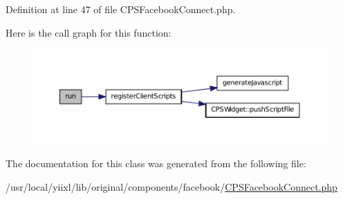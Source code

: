 Definition at line 47 of file CPSFacebookConnect.php.








Here is the call graph for this function:\nopagebreak
\begin{figure}[H]
\begin{center}
\leavevmode
\includegraphics[width=400pt]{classCPSFacebookConnect_afb0fafe7e02a3ae1993c01c19fad2bae_cgraph}
\end{center}
\end{figure}




The documentation for this class was generated from the following file:\begin{DoxyCompactItemize}
\item 
/usr/local/yiixl/lib/original/components/facebook/\hyperlink{CPSFacebookConnect_8php}{CPSFacebookConnect.php}\end{DoxyCompactItemize}
